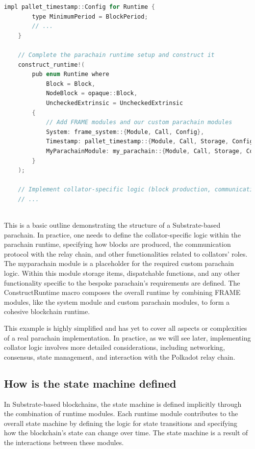 \documentclass{tufte-handout}
\begin{document}
\begin{lstlisting}[language=C, caption=FRAME framework example]
    impl pallet_timestamp::Config for Runtime {
        type MinimumPeriod = BlockPeriod;
        // ...
    }
    
    // Complete the parachain runtime setup and construct it
    construct_runtime!(
        pub enum Runtime where
            Block = Block,
            NodeBlock = opaque::Block,
            UncheckedExtrinsic = UncheckedExtrinsic
        {
            // Add FRAME modules and our custom parachain modules
            System: frame_system::{Module, Call, Config},
            Timestamp: pallet_timestamp::{Module, Call, Storage, Config<T>},
            MyParachainModule: my_parachain::{Module, Call, Storage, Config<T>},
        }
    );
    
    // Implement collator-specific logic (block production, communication with relay chain, etc.)
    // ...
    
    \end{lstlisting}

This is a basic outline demonstrating the structure of a Substrate-based parachain. In practice, one needs to define the collator-specific logic within the parachain runtime,
specifying how blocks are produced, the communication protocol with the relay chain, and other functionalities related to collators' roles.
The myparachain module is a placeholder for the required custom parachain logic. Within this module storage items, dispatchable functions, and any other functionality
specific to the bespoke parachain's requirements are defined.
The ConstructRuntime macro composes the overall runtime by combining FRAME modules, like the system module and custom parachain modules, to form a cohesive blockchain runtime.

This example is highly simplified and has yet to cover all aspects or complexities of a real parachain implementation. In practice, as we will see later, implementing
collator logic involves more detailed considerations, including networking, consensus, state management, and interaction with the Polkadot relay chain.


\subsection{How is the state machine defined}\label{sec:headings}
In Substrate-based blockchains, the state machine is defined implicitly through the combination of runtime modules. Each runtime module contributes to the overall state machine
by defining the logic for state transitions and specifying how the blockchain's state can change over time. The state machine is a result of the interactions between these modules.
\end{document}

